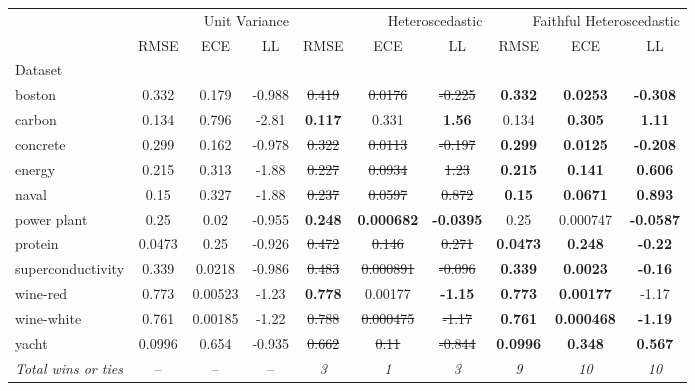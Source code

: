 \begin{tabular}{l|ccc|ccc|ccc}
\toprule
{} & \multicolumn{3}{r}{Unit Variance} & \multicolumn{3}{r}{Heteroscedastic} & \multicolumn{3}{r}{Faithful Heteroscedastic} \\
{} & {RMSE} & {ECE} & {LL} & {RMSE} & {ECE} & {LL} & {RMSE} & {ECE} & {LL} \\
{Dataset} & {} & {} & {} & {} & {} & {} & {} & {} & {} \\
\midrule
boston & 0.332 & 0.179 & -0.988 & \sout{0.419} & \sout{0.0176} & \sout{-0.225} & \textbf{0.332} & \textbf{0.0253} & \textbf{-0.308} \\
carbon & 0.134 & 0.796 & -2.81 & \textbf{0.117} & 0.331 & \textbf{1.56} & 0.134 & \textbf{0.305} & \textbf{1.11} \\
concrete & 0.299 & 0.162 & -0.978 & \sout{0.322} & \sout{0.0113} & \sout{-0.197} & \textbf{0.299} & \textbf{0.0125} & \textbf{-0.208} \\
energy & 0.215 & 0.313 & -1.88 & \sout{0.227} & \sout{0.0934} & \sout{1.23} & \textbf{0.215} & \textbf{0.141} & \textbf{0.606} \\
naval & 0.15 & 0.327 & -1.88 & \sout{0.237} & \sout{0.0597} & \sout{0.872} & \textbf{0.15} & \textbf{0.0671} & \textbf{0.893} \\
power plant & 0.25 & 0.02 & -0.955 & \textbf{0.248} & \textbf{0.000682} & \textbf{-0.0395} & 0.25 & 0.000747 & \textbf{-0.0587} \\
protein & 0.0473 & 0.25 & -0.926 & \sout{0.472} & \sout{0.146} & \sout{0.271} & \textbf{0.0473} & \textbf{0.248} & \textbf{-0.22} \\
superconductivity & 0.339 & 0.0218 & -0.986 & \sout{0.483} & \sout{0.000891} & \sout{-0.096} & \textbf{0.339} & \textbf{0.0023} & \textbf{-0.16} \\
wine-red & 0.773 & 0.00523 & -1.23 & \textbf{0.778} & 0.00177 & \textbf{-1.15} & \textbf{0.773} & \textbf{0.00177} & -1.17 \\
wine-white & 0.761 & 0.00185 & -1.22 & \sout{0.788} & \sout{0.000475} & \sout{-1.17} & \textbf{0.761} & \textbf{0.000468} & \textbf{-1.19} \\
yacht & 0.0996 & 0.654 & -0.935 & \sout{0.662} & \sout{0.11} & \sout{-0.844} & \textbf{0.0996} & \textbf{0.348} & \textbf{0.567} \\
\textit{{Total wins or ties}} & -- & -- & -- & \textit{3} & \textit{1} & \textit{3} & \textit{9} & \textit{10} & \textit{10} \\
\bottomrule
\end{tabular}
